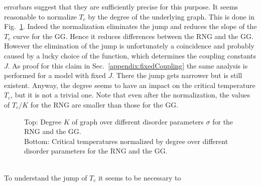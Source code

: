         errorbars suggest that they are sufficiently precise for this purpose.
        It seems reasonable to normalize \(T_c\) by the degree of the underlying
        graph. This is done in Fig.\ \ref{fig:Tc_deg}.
        Indeed the normalization eliminates the jump and reduces the
        slope of the \(T_c\) curve for the GG. Hence it reduces differences
        between the RNG and the GG. However the elimination of the jump is
        unfortunately a coincidence and probably caused by a lucky choice of the
        function, which determines the coupling constants \(J\). As proof for
        this claim in Sec.\ \ref{appendix:fixedCoupling} the same analysis
        is performed for a model with fixed \(J\). There the jump gets narrower
        but is still existent. Anyway, the degree seems to have an impact on
        the critical temperature \(T_c\), but it is not a trivial one.
        Note that even after the normalization, the values of \(T_c / K\)
        for the RNG are smaller than those for the GG.
        \begin{figure}[htbp]
            \centering


            \caption[Critical Temperature Normalized by Degree of the Graph]
            {
                Top: Degree \(K\) of graph over different
                disorder parameters \(\sigma\) for
                 the RNG and
                 the GG.\\
                Bottom: Critical temperatures normalized by degree over different
                disorder parameters for
                 the RNG and
                 the GG.
            }
            \label{fig:Tc_deg}
        \end{figure}\\
        To understand the jump of \(T_c\) it seems to be necessary to
